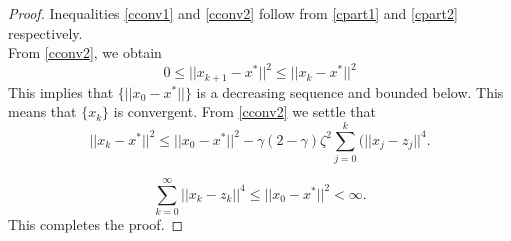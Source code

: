 \documentclass{article}
\newcommand{\R}{\mathbb{R}} %
\newtheorem{lemma}{Lemma}
\theoremstyle{remark}
\begin{document}
{{\begin{proof}
Inequalities \eqref{cconv1} and \eqref{cconv2} follow from \eqref{cpart1} and \eqref{cpart2}  respectively.\\
From \eqref{cconv2}, we obtain
\[
0\leq || x_{k+1}-x^*||^2\leq ||x_k-x^*||^2
\]
This implies that $\{||x_0-x^*||\}$ is a decreasing sequence and bounded below. This means that $\{x_k\}$ is convergent.
From \eqref{cconv2} we settle that 
\begin{equation}\label{cconv3}
   || x_{k}-x^*||^2\leq ||x_0-x^*||^2- \gamma(2-\gamma)\zeta^2\sum_{j=0}^k( ||x_j-z_j||^4.
\end{equation}

 
 \[
 \sum_{k=0}^{\infty} ||x_k-z_k||^4\leq ||x_0-x^*||^2 <\infty.
 \]
 This completes the proof.
\end{proof}
    

}}
\end{document}
